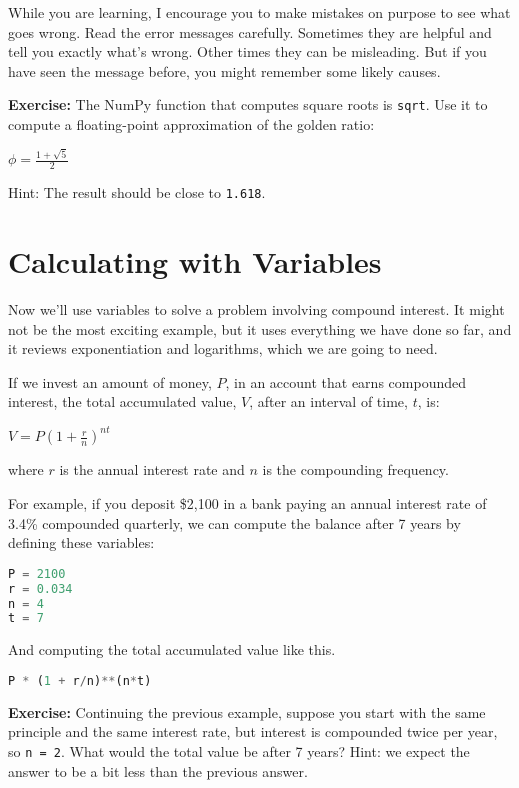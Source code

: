While you are learning, I encourage you to make mistakes on purpose to
see what goes wrong. Read the error messages carefully. Sometimes they
are helpful and tell you exactly what's wrong. Other times they can be
misleading. But if you have seen the message before, you might remember
some likely causes.

\textbf{Exercise:} The NumPy function that computes square roots is
\passthrough{\lstinline!sqrt!}. Use it to compute a floating-point
approximation of the golden ratio:

\(\phi = \frac{1 + \sqrt{5}}{2}\)

Hint: The result should be close to \passthrough{\lstinline!1.618!}.

\hypertarget{calculating-with-variables}{%
\section{Calculating with Variables}\label{calculating-with-variables}}

Now we'll use variables to solve a problem involving compound interest.
It might not be the most exciting example, but it uses everything we
have done so far, and it reviews exponentiation and logarithms, which we
are going to need.

If we invest an amount of money, \(P\), in an account that earns
compounded interest, the total accumulated value, \(V\), after an
interval of time, \(t\), is:

\(V=P\left(1+{\frac {r}{n}}\right)^{nt}\)

where \(r\) is the annual interest rate and \(n\) is the compounding
frequency.

For example, if you deposit \$2,100 in a bank paying an annual interest
rate of 3.4\% compounded quarterly, we can compute the balance after 7
years by defining these variables:

\begin{lstlisting}[language=Python,style=source]
P = 2100
r = 0.034
n = 4
t = 7
\end{lstlisting}

And computing the total accumulated value like this.

\begin{lstlisting}[language=Python,style=source]
P * (1 + r/n)**(n*t)
\end{lstlisting}

\textbf{Exercise:} Continuing the previous example, suppose you start
with the same principle and the same interest rate, but interest is
compounded twice per year, so \passthrough{\lstinline!n = 2!}. What
would the total value be after 7 years? Hint: we expect the answer to be
a bit less than the previous answer.


